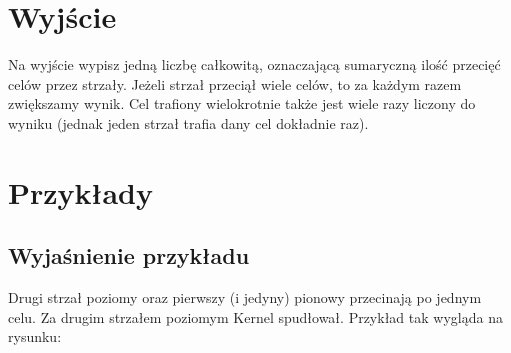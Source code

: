 \documentclass[zad,zawodnik,utf8]{sinol}
\begin{document}
\begin{tasktext}
\section{Wyjście}

\par Na wyjście wypisz jedną liczbę całkowitą, oznaczającą sumaryczną ilość przecięć celów przez strzały. Jeżeli strzał przeciął wiele celów, to za każdym razem zwiększamy wynik. Cel trafiony wielokrotnie także jest wiele razy liczony do wyniku (jednak jeden strzał trafia dany cel dokładnie raz).

\pagebreak

\section{Przykłady}
\subsection{Wyjaśnienie przykładu}
\par Drugi strzał poziomy oraz pierwszy (i jedyny) pionowy przecinają po jednym celu. Za drugim strzałem poziomym Kernel spudłował. Przykład tak wygląda na rysunku:
\par {}

\begin{points}
\end{points}

\end{tasktext}
	
\end{document}
